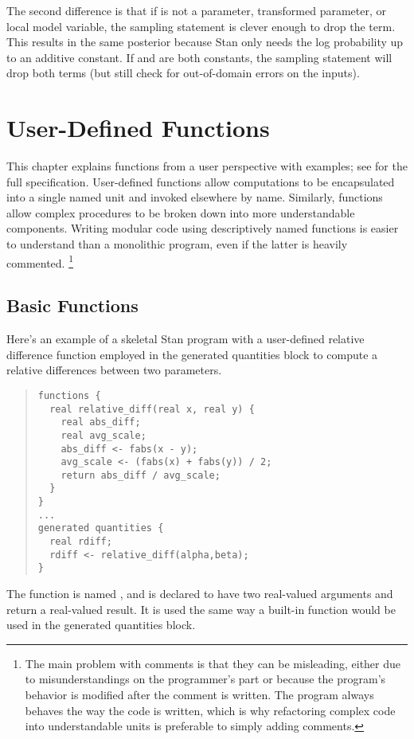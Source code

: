The second difference is that if  is not a parameter,
transformed parameter, or local model variable, the sampling statement
is clever enough to drop the  term.  This results in
the same posterior because Stan only needs the log probability up to
an additive constant.  If  and  are both
constants, the sampling statement will drop both terms (but still
check for out-of-domain errors on the inputs).


\chapter{User-Defined Functions}\label{functions-programming.chapter}

\noindent
This chapter explains functions from a user perspective with examples;
see  for the full specification.  User-defined
functions allow computations to be encapsulated into a single named
unit and invoked elsewhere by name.  Similarly, functions allow
complex procedures to be broken down into more understandable
components.  Writing modular code using descriptively named functions
is easier to understand than a monolithic program, even if the latter
is heavily commented.%
%
\footnote{The main problem with comments is that they can be
  misleading, either due to misunderstandings on the programmer's part
  or because the program's behavior is modified after the comment is
  written.  The program always behaves the way the code is written,
  which is why refactoring complex code into understandable units is
  preferable to simply adding comments.}

\section{Basic Functions}\label{basic-functions.section}

Here's an example of a skeletal Stan program with a user-defined
relative difference function employed in the generated quantities
block to compute a relative differences between two parameters.
%
\begin{quote}
\begin{Verbatim}
functions {
  real relative_diff(real x, real y) {
    real abs_diff;
    real avg_scale;
    abs_diff <- fabs(x - y);
    avg_scale <- (fabs(x) + fabs(y)) / 2;
    return abs_diff / avg_scale;
  }
}
...
generated quantities {
  real rdiff;
  rdiff <- relative_diff(alpha,beta);
}
\end{Verbatim}
\end{quote}
%
The function is named , and is declared to have
two real-valued arguments and return a real-valued result.   It is
used the same way a built-in function would be used in the generated
quantities block.

